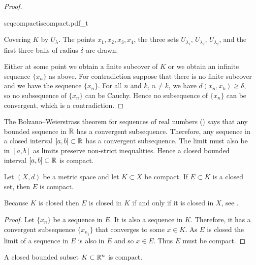 \begin{proof}
\begin{myfigureht}
{seqcompactiscompact.pdf_t}
\caption{Covering $K$ by $U_{\lambda}$.  The points
$x_1,x_2,x_3,x_4$, 
the three sets 
$U_{\lambda_1}$,
$U_{\lambda_2}$,
$U_{\lambda_2}$,
and 
the first three balls
of radius $\delta$ are drawn.\label{fig:seqcompactiscompact}}
\end{myfigureht}

Either at some point we obtain a finite subcover of $K$
or we obtain an
infinite
sequence $\{ x_n \}$ as above.
For contradiction suppose that
there is no finite subcover and we have the sequence $\{ x_n \}$.
For all $n$ and $k$, $n \not= k$, 
we have $d(x_n,x_k) \geq \delta$,
so no subsequence of $\{ x_n \}$ can be
Cauchy.  Hence no subsequence of $\{ x_n \}$ can be convergent,
which is a contradiction.
\end{proof}

\begin{example}
The Bolzano--Weierstrass theorem for sequences of real numbers
()
says that any bounded sequence in ${\mathbb{R}}$ has a convergent
subsequence.  Therefore, any sequence in a closed interval $[a,b] \subset {\mathbb{R}}$ has 
a convergent subsequence.  The limit must also be in $[a,b]$ as limits
preserve non-strict inequalities.  Hence a closed bounded interval $[a,b]
\subset {\mathbb{R}}$ is compact.
\end{example}

\begin{prop}
Let $(X,d)$ be a metric space and let $K \subset X$ be compact.  If
$E \subset K$ is a closed set, then $E$ is compact.
\end{prop}

Because $K$ is closed then $E$ is closed in $K$ if
and only if it is closed in $X$,
see .

\begin{proof}
Let $\{ x_n \}$ be a sequence in $E$.  It is also a sequence in $K$.
Therefore, it has a convergent subsequence $\{ x_{n_j} \}$ that converges to
some $x \in K$.  As $E$ is closed the limit of a sequence in $E$ is also in $E$
and so $x \in E$.  Thus $E$ must be compact.
\end{proof}

\begin{thm}%
\label{thm:msbw}
A closed bounded subset $K \subset {\mathbb{R}}^n$ is compact.
\end{thm}

